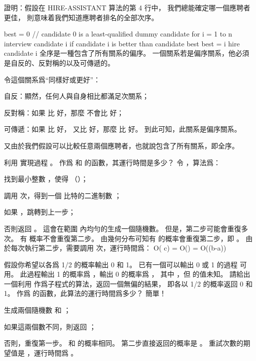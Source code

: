 \startsection[
  title={The hiring problem},
]

\startEXERCISE
證明：假設在 HIRE-ASSISTANT 算法的第 4 行中，
我們總能確定哪一個應聘者更佳，
則意味着我們知道應聘者排名的全部次序。

\startCLRS
best = 0	// candidate 0 is a least-qualified dummy candidate
for i = 1 to n
	interview candidate i
	if candidate i is better than candidate best
		best = i
		hire candidate i
\stopCLRS
\stopEXERCISE
\startANSWER
全序是一種包含了所有關系的偏序。
一個關系若是偏序關系，他必須是自反的、反對稱的以及可傳遞的。

令這個關系爲“同樣好或更好”：
\startigBase[1]
\item 自反：顯然，任何人與自身相比都滿足次關系；
\item 反對稱：如果  比  好，那麼  不會比  好；
\item 可傳遞：如果  比  好，  又比  好，那麼  比  好。
\stopigBase
到此可知，此關系是偏序關系。

又由於我們假設可以比較任意兩個應聘者，也就說包含了所有關系，即全序。
\stopANSWER

\startEXERCISE \DIFFICULT
利用  實現過程 。
作爲  和  的函數，其運行時間是多少？
\stopEXERCISE
\startANSWER
令 ，算法爲：
\startigBase[n]
\item 找到最小整數 ，使得  （）；
\item 調用   次，得到一個  比特的二進制數 ；
\item 如果 ，跳轉到上一步；
\item 否則返回 。
\stopigBase
這會在範圍 \m{[a, b]} 內均勻的生成一個隨機數。
但是，第二步可能會重復多次。
有  概率不會重復第二步。
由幾何分布可知有  的概率會重復第二步，即 。
由於每次執行第二步，需要調用   次，運行時間爲：
\startformula
O( c) = O() = O(\ln(b-a))
\stopformula
\stopANSWER

\startEXERCISE \DIFFICULT
假設你希望以各爲 1/2 的概率輸出 0 和 1。
已有一個可以輸出 0 或 1 的過程  可用。
此過程輸出 1 的概率爲 ，輸出 0 的概率爲 ，
其中 ，但  的值未知。
請給出一個利用  作爲子程式的算法，返回一個無偏的結果，
即各以 1/2 的概率返回 0 和 1。
作爲  的函數，此算法的運行時間爲多少？
\stopEXERCISE
\startANSWER
簡單！
\startigBase[n]
\item 生成兩個隨機數  和 ；
\item 如果這兩個數不同，則返回 ；
\item 否則，重復第一步。
\stopigBase
{} 和  的概率相同。
第二步直接返回的概率是 。
重試次數的期望值是 ，運行時間爲 。
\stopANSWER

\stopsection
